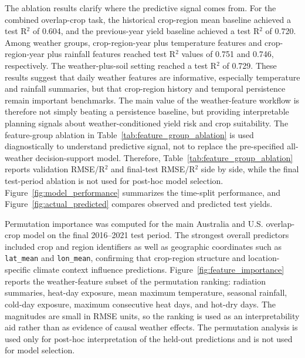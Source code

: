 \documentclass[11pt,a4paper]{article}
\begin{document}
The ablation results clarify where the predictive signal comes from. For the combined overlap-crop task, the historical crop-region mean baseline achieved a test R$^2$ of 0.604, and the previous-year yield baseline achieved a test R$^2$ of 0.720. Among weather groups, crop-region-year plus temperature features and crop-region-year plus rainfall features reached test R$^2$ values of 0.751 and 0.746, respectively. The weather-plus-soil setting reached a test R$^2$ of 0.729. These results suggest that daily weather features are informative, especially temperature and rainfall summaries, but that crop-region history and temporal persistence remain important benchmarks. The main value of the weather-feature workflow is therefore not simply beating a persistence baseline, but providing interpretable planning signals about weather-conditioned yield risk and crop suitability. The feature-group ablation in Table~\ref{tab:feature_group_ablation} is used diagnostically to understand predictive signal, not to replace the pre-specified all-weather decision-support model. Therefore, Table~\ref{tab:feature_group_ablation} reports validation RMSE/R$^2$ and final-test RMSE/R$^2$ side by side, while the final test-period ablation is not used for post-hoc model selection. Figure~\ref{fig:model_performance} summarizes the time-split performance, and Figure~\ref{fig:actual_predicted} compares observed and predicted test yields.

Permutation importance was computed for the main Australia and U.S. overlap-crop model on the final 2016--2021 test period. The strongest overall predictors included crop and region identifiers as well as geographic coordinates such as \texttt{lat\_mean} and \texttt{lon\_mean}, confirming that crop-region structure and location-specific climate context influence predictions. Figure~\ref{fig:feature_importance} reports the weather-feature subset of the permutation ranking: radiation summaries, heat-day exposure, mean maximum temperature, seasonal rainfall, cold-day exposure, maximum consecutive heat days, and hot-dry days. The magnitudes are small in RMSE units, so the ranking is used as an interpretability aid rather than as evidence of causal weather effects. The permutation analysis is used only for post-hoc interpretation of the held-out predictions and is not used for model selection.
\end{document}
